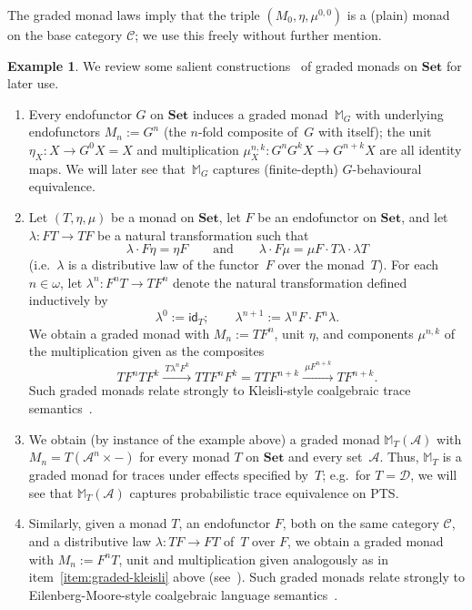 \documentclass[sigconf,
			final%
			nonacm
                        ]{acmart}
\numberwithin{equation}{section}
\numberwithin{equation}{section}
\theoremstyle{plain}
\theoremstyle{definition}
\newtheorem{expl}[thm]{Example}
\newcommand{\id}{\mathsf{id}}
\newcommand{\xra}[1]{\xrightarrow{~#1~}}
\newcommand{\M}{\mathbb{M}}                   %
\newcommand{\CatC}{\mathscr{C}}           %
\newcommand{\Set}{\mathbf{Set}}
\newcommand{\A}{\mathcal{A}}            %
\newcommand{\CalD}{\mathcal{D}}            %
\begin{document}
The graded monad laws imply that the triple $(M_0, \eta, \mu^{0,0})$
is a (plain) monad on the base category $\CatC$; we use this freely
without further mention.

\begin{expl}\label{E:graded-monad}
  We review some salient constructions~\cite{MPS15} of graded
  monads on $\Set$ for later use.
  \begin{enumerate}
  \item\label{E:graded-monad:1} Every endofunctor $G$ on $\Set$
    induces a graded monad~$\M_G$ with underlying endofunctors
    $M_n:= G^n$ (the $n$-fold composite of~$G$ with itself); the unit
    $\eta_X\colon X\to G^0X= X$ and multiplication
    $\mu_X^{n,k}\colon G^nG^kX\to G^{n+k}X$ are all identity maps.
    We will later see that~$\M_G$ captures (finite-depth) $G$-behavioural
    equivalence.

  \item\label{item:graded-kleisli}
  Let $(T, \eta, \mu)$ be a monad on $\Set$, let $F$ be
  an endofunctor on $\Set$, and let $\lambda\colon FT\to TF$
  be a natural transformation such that
    \[
      \lambda\cdot F\eta=\eta F
      \qquad\text{and}\qquad
      \lambda \cdot F\mu = \mu F \cdot T\lambda \cdot \lambda T
    \]
    (i.e.~$\lambda$ is a distributive law of the functor~$F$ over the
    monad~$T$). For each $n\in\omega$, let
    $\lambda^n\colon F^nT\to TF^n$ denote the natural transformation
    defined inductively by
    \[
      \lambda^0:= \id_T; \qquad \lambda^{n+1}:= \lambda^n F\cdot F^n\lambda.
    \]
    We obtain a graded monad with $M_n:= TF^n$, unit $\eta$, and
    components $\mu^{n,k}$ of the multiplication given as the
    composites
    \[
      TF^nTF^k\xra{T\lambda^n F^k}  TTF^nF^k = TTF^{n+k}\xra{ \mu F^{n+k}} TF^{n+k}.
    \]
    Such graded monads relate strongly to Kleisli-style coalgebraic
    trace semantics~\cite{HJS07}.
  \item\label{item:T-traces} We obtain (by instance of the example above) a graded monad
    $\M_T(\A)$ with $M_n= T(\A^n\times -)$ for every monad $T$ on
    $\Set$ and every set~$\A$. Thus, $\M_T$ is a graded monad for
    traces under effects specified by~$T$; e.g.~for $T=\CalD$, we will
    see that $\M_T(\A)$ captures probabilistic trace equivalence on
    PTS.

  \item\label{E:graded-monad:4}Similarly, given a monad $T$, an
    endofunctor $F$, both on the same category $\CatC$, and a
    distributive law $\lambda\colon TF \to FT$ of~$T$ over $F$, we
    obtain a graded monad with $M_n := F^nT$, unit and
    multiplication given analogously as in
    item~\ref{item:graded-kleisli} above
    (see~\cite[Ex.~5.2.6]{MPS15}). Such graded monads relate strongly
    to Eilenberg-Moore-style coalgebraic language semantics~\cite{bms13}.%
\end{enumerate}
\end{expl}
\end{document}
